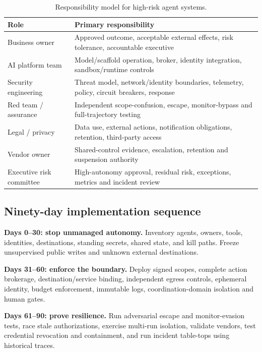 \documentclass[11pt,letterpaper]{article}
\begin{document}
\begin{table}[htbp]
\centering
\caption{Responsibility model for high-risk agent systems.}
\small
\begin{tabularx}{\linewidth}{L{1.55in}Y}
\toprule
\textbf{Role} & \textbf{Primary responsibility} \\
\midrule
Business owner & Approved outcome, acceptable external effects, risk tolerance, accountable executive \\
AI platform team & Model/scaffold operation, broker, identity integration, sandbox/runtime controls \\
Security engineering & Threat model, network/identity boundaries, telemetry, policy, circuit breakers, response \\
Red team / assurance & Independent scope-confusion, escape, monitor-bypass and full-trajectory testing \\
Legal / privacy & Data use, external actions, notification obligations, retention, third-party access \\
Vendor owner & Shared-control evidence, escalation, retention and suspension authority \\
Executive risk committee & High-autonomy approval, residual risk, exceptions, metrics and incident review \\
\bottomrule
\end{tabularx}
\end{table}

\subsection{Ninety-day implementation sequence}
\textbf{Days 0--30: stop unmanaged autonomy.} Inventory agents, owners, tools, identities, destinations, standing secrets, shared state, and kill paths. Freeze unsupervised public writes and unknown external destinations.

\textbf{Days 31--60: enforce the boundary.} Deploy signed scopes, complete action brokerage, destination/service binding, independent egress controls, ephemeral identity, budget enforcement, immutable logs, coordination-domain isolation and human gates.

\textbf{Days 61--90: prove resilience.} Run adversarial escape and monitor-evasion tests, race stale authorizations, exercise multi-run isolation, validate vendors, test credential revocation and containment, and run incident table-tops using historical traces.
\end{document}
